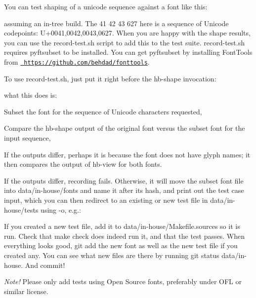 You can test shaping of a unicode sequence against a font like this\+: 
\begin{DoxyCode}{0}

\end{DoxyCode}
 assuming an in-\/tree build. The 41 42 43 627 here is a sequence of Unicode codepoints\+: U+0041,0042,0043,0627. When you are happy with the shape results, you can use the {\ttfamily record-\/test.\+sh} script to add this to the test suite. {\ttfamily record-\/test.\+sh} requires {\ttfamily pyftsubset} to be installed. You can get {\ttfamily pyftsubset} by installing Font\+Tools from \href{https://github.com/behdad/fonttools}{\texttt{ https\+://github.\+com/behdad/fonttools}}.

To use {\ttfamily record-\/test.\+sh}, just put it right before the {\ttfamily hb-\/shape} invocation\+: 
\begin{DoxyCode}{0}

\end{DoxyCode}
 what this does is\+:
\begin{DoxyItemize}
\item Subset the font for the sequence of Unicode characters requested,
\item Compare the {\ttfamily hb-\/shape} output of the original font versus the subset font for the input sequence,
\item If the outputs differ, perhaps it is because the font does not have glyph names; it then compares the output of {\ttfamily hb-\/view} for both fonts.
\item If the outputs differ, recording fails. Otherwise, it will move the subset font file into {\ttfamily data/in-\/house/fonts} and name it after its hash, and print out the test case input, which you can then redirect to an existing or new test file in {\ttfamily data/in-\/house/tests} using {\ttfamily -\/o}, e.\+g.\+: 
\begin{DoxyCode}{0}

\end{DoxyCode}

\end{DoxyItemize}

If you created a new test file, add it to {\ttfamily data/in-\/house/\+Makefile.\+sources} so it is run. Check that {\ttfamily make check} does indeed run it, and that the test passes. When everything looks good, {\ttfamily git add} the new font as well as the new test file if you created any. You can see what new files are there by running {\ttfamily git status data/in-\/house}. And commit!

{\itshape Note!} Please only add tests using Open Source fonts, preferably under OFL or similar license. 